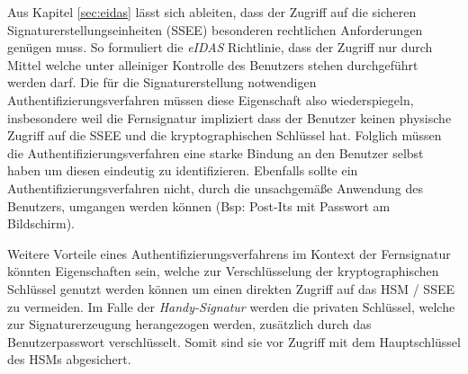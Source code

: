 \documentclass[11pt,a4paper,ngerman]{scrreprt}
\begin{document}
Aus Kapitel \ref{sec:eidas} lässt sich ableiten, dass der Zugriff auf die sicheren Signaturerstellungseinheiten (SSEE) besonderen rechtlichen Anforderungen genügen muss. So formuliert die \textit{eIDAS} Richtlinie, dass der Zugriff nur durch Mittel welche unter alleiniger Kontrolle des Benutzers stehen durchgeführt werden darf. Die für die Signaturerstellung notwendigen Authentifizierungsverfahren müssen diese Eigenschaft also wiederspiegeln, insbesondere weil die Fernsignatur impliziert dass der Benutzer keinen physische Zugriff auf die SSEE und die kryptographischen Schlüssel hat. Folglich müssen die Authentifizierungsverfahren eine starke Bindung an den Benutzer selbst haben um diesen eindeutig zu identifizieren. Ebenfalls sollte ein Authentifizierungsverfahren nicht, durch die unsachgemäße Anwendung des Benutzers, umgangen werden können (Bsp: Post-Its mit Passwort am Bildschirm).

Weitere Vorteile eines Authentifizierungsverfahrens im Kontext der Fernsignatur könnten Eigenschaften sein, welche zur Verschlüsselung der kryptographischen Schlüssel genutzt werden können um einen direkten Zugriff auf das HSM / SSEE zu vermeiden. Im Falle der \textit{Handy-Signatur} werden die privaten Schlüssel, welche zur Signaturerzeugung herangezogen werden, zusätzlich durch das Benutzerpasswort verschlüsselt. Somit sind sie vor Zugriff mit dem Hauptschlüssel des HSMs abgesichert. 
\end{document}
